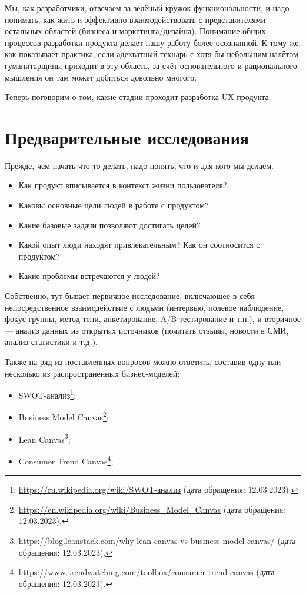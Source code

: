 \documentclass{../../text-style}
\begin{document}
Мы, как разработчики, отвечаем за зелёный кружок функциональности, и надо понимать, как жить и эффективно взаимодействовать с представителями остальных областей (бизнеса и маркетинга/дизайна). Понимание общих процессов разработки продукта делает нашу работу более осознанной. К тому же, как показывает практика, если адекватный технарь с хотя бы небольшим налётом гуманитарщины приходит в эту область, за счёт основательного и рационального мышления он там может добиться довольно многого.

Теперь поговорим о том, какие стадии проходит разработка UX продукта.

\section{Предварительные исследования}

Прежде, чем начать что-то делать, надо понять, что и для кого мы делаем.

\begin{itemize}
    \item Как продукт вписывается в контекст жизни пользователя? 
    \item Каковы основные цели людей в работе с продуктом? 
    \item Какие базовые задачи позволяют достигать целей? 
    \item Какой опыт люди находят привлекательным? Как он соотносится с продуктом?
    \item Какие проблемы встречаются у людей?
\end{itemize}

Собственно, тут бывает первичное исследование, включающее в себя непосредственное взаимодействие с людьми (интервью, полевое наблюдение, фокус-группы, метод тени, анкетирование, A/B тестирование и т.п.), и вторичное --- анализ данных из открытых источников (почитать отзывы, новости в СМИ, анализ статистики и т.д.).

Также на ряд из поставленных вопросов можно ответить, составив одну или несколько из распространённых бизнес-моделей:

\begin{itemize}
    \item SWOT-анализ\footnote{\url{https://ru.wikipedia.org/wiki/SWOT-анализ} (дата обращения: 12.03.2023).};
    \item Business Model Canvas\footnote{\url{https://en.wikipedia.org/wiki/Business_Model_Canvas} (дата обращения: 12.03.2023).};
    \item Lean Canvas\footnote{\url{https://blog.leanstack.com/why-lean-canvas-vs-business-model-canvas/} (дата обращения: 12.03.2023).};
    \item Consumer Trend Canvas\footnote{\url{https://www.trendwatching.com/toolbox/consumer-trend-canvas} (дата обращения: 12.03.2023).};
\end{itemize}
\end{document}

